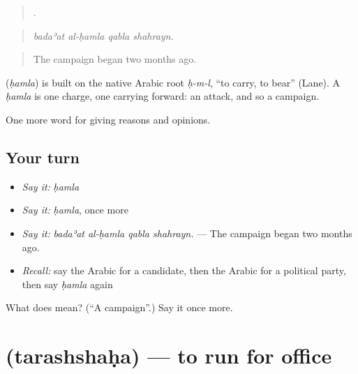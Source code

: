 \begin{quote}
   .
\end{quote}

\begin{quote}
\emph{badaʾat al-ḥamla qabla shahrayn.}
\end{quote}

\begin{quote}
The campaign began two months ago.
\end{quote}

\begin{cousinweb}
\textbf{} (\emph{ḥamla}) is built on the native Arabic root \emph{ḥ-m-l}, \textquotedblleft{}to carry, to bear\textquotedblright{} (Lane). A \emph{ḥamla} is one charge, one carrying forward: an attack, and so a campaign.
\end{cousinweb}

\begin{grammarlens}[title={What you've built}]
One more word for giving reasons and opinions.
\end{grammarlens}

\subsection*{Your turn}
\begin{itemize}
\raggedright
  \item \emph{Say it:} \emph{ḥamla}
  \item \emph{Say it:} \emph{ḥamla}, once more
  \item \emph{Say it:} \emph{badaʾat al-ḥamla qabla shahrayn.} — The campaign began two months ago.
  \item \emph{Recall:} say the Arabic for a candidate, then the Arabic for a political party, then say \emph{ḥamla} again
\end{itemize}

\begin{tcolorbox}[breakable,colback=teal!4,colframe=teal!35!black,title={Before you move on}]
What does  mean? (\textquotedblleft{}A campaign\textquotedblright{}.) Say it once more.
\end{tcolorbox}
\section[\texorpdfstring{\ar{ترشح} (tarashshaḥa)}{ترشح (tarashshaḥa)}]{ (tarashshaḥa) — to run for office}

\label{lesson:AR-C379-tarashshaha}



